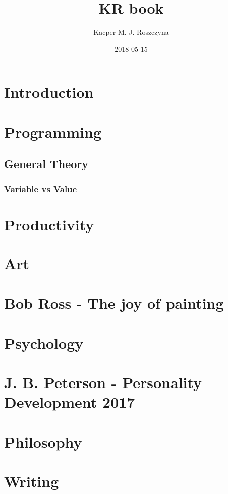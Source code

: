\documentclass{article}
\title{KR book}
\date{2018-05-15}
\author{Kacper M. J. Roszczyna}
\begin{document}

\maketitle
\newpage


\doublespacing
\tableofcontents
\newpage
\singlespacing

\section{Introduction}


\section{Programming}
\subsection{General Theory}
\subsubsection{Variable vs Value}

\section{Productivity}

\section{Art}
\section{Bob Ross - The joy of painting}

\section{Psychology}
\section{J. B. Peterson - Personality Development 2017}

\section{Philosophy}

\section{Writing}
\end{document}
